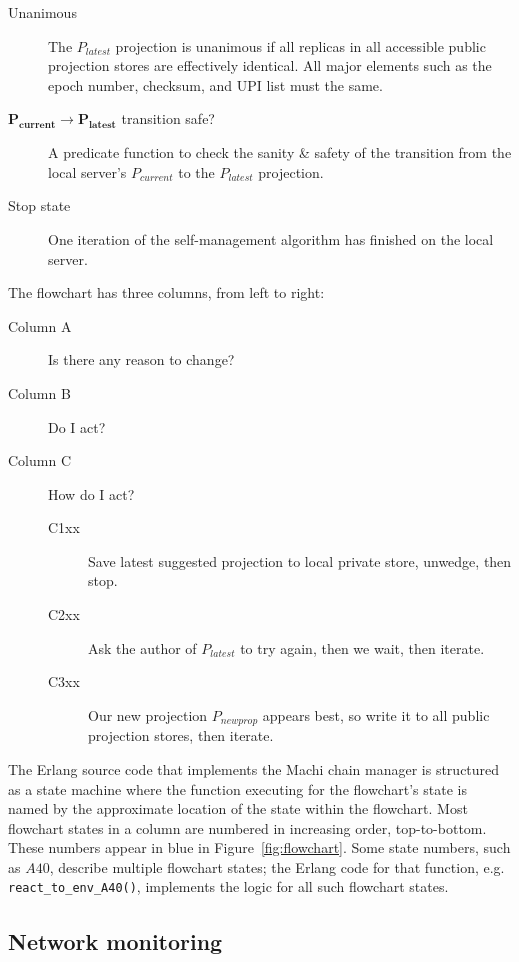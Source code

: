 \documentclass[preprint,10pt]{sigplanconf}
\begin{document}
\begin{description}
\item[Unanimous] The $P_{latest}$ projection is unanimous if all
  replicas in all accessible public projection stores are effectively
  identical.  All major elements such as the epoch number, checksum,
  and UPI list must the same.

\item[$\mathbf{P_{current} \rightarrow P_{latest}}$ transition safe?]
  A predicate function to
  check the sanity \& safety of the transition from the local server's
  $P_{current}$ to the $P_{latest}$ projection.

\item[Stop state] One iteration of the self-management algorithm has
  finished on the local server.
\end{description}

The flowchart has three columns, from left to right:

\begin{description}
\item[Column A] Is there any reason to change?
\item[Column B] Do I act?
\item[Column C] How do I act?
  \begin{description}
  \item[C1xx] Save latest suggested projection to local private store, unwedge,
    then stop.
  \item[C2xx] Ask the author of $P_{latest}$ to try again, then we wait,
    then iterate.
  \item[C3xx] Our new projection $P_{newprop}$ appears best, so write it
    to all public projection stores, then iterate.
  \end{description}
\end{description}

The Erlang source code that implements the Machi chain manager is
structured as a state machine where the function executing for the
flowchart's state is named by the approximate location of the state
within the flowchart.
Most flowchart states in a column are numbered in increasing order,
top-to-bottom.  These numbers appear in blue in
Figure~\ref{fig:flowchart}.  Some state numbers, such as $A40$,
describe multiple flowchart states; the Erlang code for that function,
e.g. {\tt react\_to\_\-env\_A40()}, implements the logic for all such
flowchart states.

\subsection{Network monitoring}
\label{sub:humming-network-monitoring}
\end{document}
